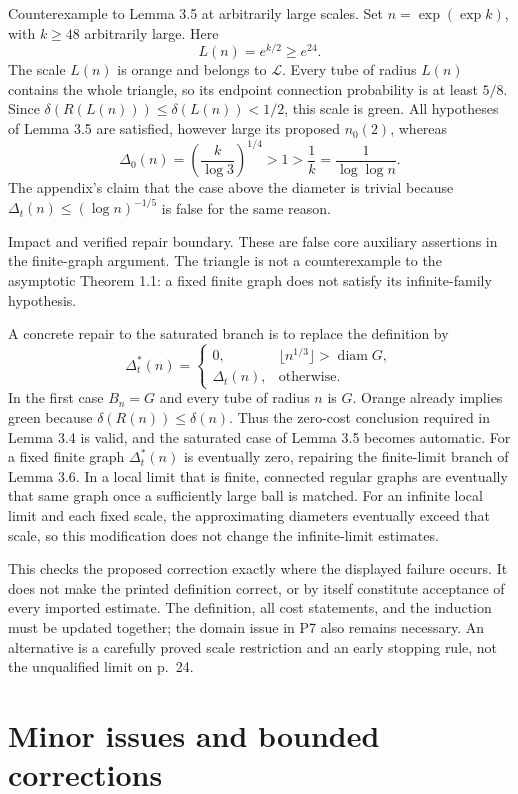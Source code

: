 \documentclass[10pt]{article}
\begin{document}
Counterexample to Lemma 3.5 at arbitrarily large scales. Set \(n=\exp(\exp k)\), with \(k\ge48\) arbitrarily large. Here \[L(n)=e^{k/2}\ge e^{24}.\] The scale \(L(n)\) is orange and belongs to \(\mathcal L\). Every tube of radius \(L(n)\) contains the whole triangle, so its endpoint connection probability is at least \(5/8\). Since \(\delta(R(L(n)))\le\delta(L(n))<1/2\), this scale is green. All hypotheses of Lemma 3.5 are satisfied, however large its proposed \(n_0(2)\), whereas \[\Delta_0(n)=\left(\frac{k}{\log3}\right)^{1/4}>1>\frac1k
 =\frac1{\log\log n}.\] The appendix’s claim that the case above the diameter is trivial because \(\Delta_t(n)\le(\log n)^{-1/5}\) is false for the same reason.\par
Impact and verified repair boundary. These are false core auxiliary assertions in the finite-graph argument. The triangle is not a counterexample to the asymptotic Theorem 1.1: a fixed finite graph does not satisfy its infinite-family hypothesis.\par
A concrete repair to the saturated branch is to replace the definition by \[\Delta_t^*(n)=
 \begin{cases}
 0,&\lfloor n^{1/3}\rfloor>\operatorname{diam}G,\\
 \Delta_t(n),&\text{otherwise}.
 \end{cases}\] In the first case \(B_n=G\) and every tube of radius \(n\) is \(G\). Orange already implies green because \(\delta(R(n))\le\delta(n)\). Thus the zero-cost conclusion required in Lemma 3.4 is valid, and the saturated case of Lemma 3.5 becomes automatic. For a fixed finite graph \(\Delta_t^*(n)\) is eventually zero, repairing the finite-limit branch of Lemma 3.6. In a local limit that is finite, connected regular graphs are eventually that same graph once a sufficiently large ball is matched. For an infinite local limit and each fixed scale, the approximating diameters eventually exceed that scale, so this modification does not change the infinite-limit estimates.\par
This checks the proposed correction exactly where the displayed failure occurs. It does not make the printed definition correct, or by itself constitute acceptance of every imported estimate. The definition, all cost statements, and the induction must be updated together; the domain issue in P7 also remains necessary. An alternative is a carefully proved scale restriction and an early stopping rule, not the unqualified limit on p. 24.\par
\section*{Minor issues and bounded corrections}
\end{document}
